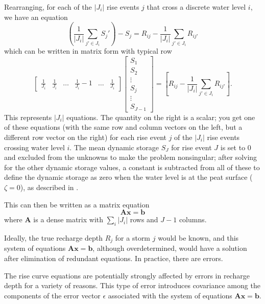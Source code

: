 \documentclass[11pt,a4paper]{article}
\renewcommand{\vec}[1]{\mathbf{#1}}
\begin{document}
Rearranging, for each of the $|J_i|$ rise events $j$ that cross a
discrete water level $i$, we have an equation
\begin{equation}
  \left(\frac{1}{|J_i|}\sum_{j' \in J_i} S_j' \right) - S_j = R_{ij} - \frac{1}{|J_i|} \sum_{j' \in J_i} R_{ij'}
\end{equation}
which can be written in matrix form with typical row
\begin{equation}
  \left[
    \begin{array}{cccccc}
      \frac{1}{J_i} & \frac{1}{J_i} & \ldots & \frac{1}{J_i} - 1 & \ldots & \frac{1}{J_i}
    \end{array}
\right]\left[
  \begin{array}{c}
    S_1 \\
    S_2 \\
    \vdots \\
    S_j \\
    \vdots \\
    S_{J-1}
  \end{array}
\right]
 = \left[R_{ij} - \frac{1}{|J_i|}\sum_{j' \in J_i} R_{ij'}\right].
\end{equation}
This represents $|J_i|$ equations. The quantity on the right is a
scalar; you get one of these equations (with the same row and column
vectors on the left, but a different row vector on the right) for each
rise event $j$ of the $|J_i|$ rise events crossing water level $i$.
The mean dynamic storage $S_J$ for rise event $J$ is set to 0 and
excluded from the unknowns to make the problem nonsingular; after
solving for the other dynamic storage values, a constant is subtracted
from all of these to define the dynamic storage as zero when the water
level is at the peat surface ($\zeta = 0$), as described in
\citet{Cobb_and_Harvey_2019}.

This can then be written as a matrix equation
\begin{equation}
  \vec{A}\vec{x} = \vec{b}
\end{equation}
where $\vec{A}$ is a dense matrix with $\sum_i |J_i|$ rows and $J - 1$
columns.

Ideally, the true recharge depth $R_j$ for a storm $j$ would be known,
and this system of equations $\vec{A}\vec{x} = \vec{b}$, although
overdetermined, would have a solution after elimination of redundant
equations.  In practice, there are errors.

The rise curve equations are potentially strongly affected by errors
in recharge depth for a variety of reasons.  This type of error
introduces covariance among the components of the error vector
$\mathbb{\epsilon}$ associated with the system of equations
$\vec{A}\vec{x} = \vec{b}$.
\end{document}
